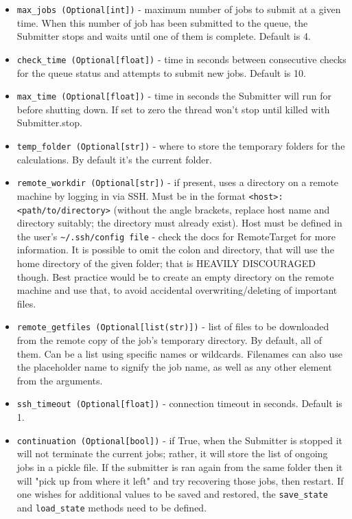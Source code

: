\documentclass[]{report}
\begin{document}
\begin{itemize}
	\item \lstinline|max_jobs (Optional[int])| - maximum number of jobs to submit at a given time. When this number of job has been submitted to the queue, the Submitter stops and waits until one of them is complete. Default is 4.
	\item \lstinline|check_time (Optional[float])| - time in seconds between consecutive checks for the queue status and attempts to submit new jobs. Default is 10.
	\item \lstinline|max_time (Optional[float])| - time in seconds the Submitter will run for before shutting down. If set to zero the thread won't stop until killed with Submitter.stop.
	\item \lstinline|temp_folder (Optional[str])| - where to store the temporary folders for the calculations. By default it's the current folder.
	\item \lstinline|remote_workdir (Optional[str])| - if present, uses a directory on a remote machine by logging in via SSH. Must be in the format \lstinline|<host>:<path/to/directory>| (without the angle brackets, replace host name and directory suitably; the directory must already exist). Host must be defined in the user's \lstinline|~/.ssh/config file| - check the docs for RemoteTarget for more information. It is possible to omit the colon and directory, that will use the home directory of the given folder; that is HEAVILY DISCOURAGED though. Best practice would be to create an empty directory on the remote machine and use that, to avoid accidental overwriting/deleting of important files.
	\item \lstinline|remote_getfiles (Optional[list(str)])| - list of files to be downloaded from the remote copy of the job's temporary directory. By default, all of them. Can be a list using specific names or wildcards. Filenames can also use the placeholder {name} to signify the job name, as well as any other element from the arguments.
	\item \lstinline|ssh_timeout (Optional[float])| - connection timeout in seconds. Default is 1.
	\item \lstinline|continuation (Optional[bool])| - if True, when the Submitter is stopped it will not terminate the current jobs; rather, it will store the list of ongoing jobs in a pickle file. If the submitter is ran again from the same folder then it will "pick up from where it left" and try recovering those jobs, then restart. If one wishes for additional values to be saved and restored, the \lstinline|save_state| and \lstinline|load_state| methods need to be defined.
\end{itemize}
\end{document}
